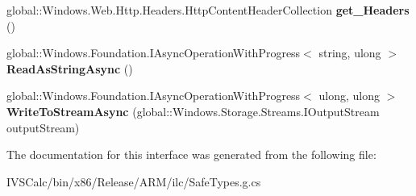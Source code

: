 \begin{DoxyCompactItemize}
global\+::\+Windows.\+Web.\+Http.\+Headers.\+Http\+Content\+Header\+Collection {\bfseries get\+\_\+\+Headers} ()
\item 
\mbox{\label{interface_windows_1_1_web_1_1_http_1_1_i_http_content_aef4019ba8a9cebd9b1025bb90c9b27c2}} 
global\+::\+Windows.\+Foundation.\+I\+Async\+Operation\+With\+Progress$<$ string, ulong $>$ {\bfseries Read\+As\+String\+Async} ()
\item 
\mbox{\label{interface_windows_1_1_web_1_1_http_1_1_i_http_content_afe0268dc0fae8ae3351e2e463f08e7f2}} 
global\+::\+Windows.\+Foundation.\+I\+Async\+Operation\+With\+Progress$<$ ulong, ulong $>$ {\bfseries Write\+To\+Stream\+Async} (global\+::\+Windows.\+Storage.\+Streams.\+I\+Output\+Stream output\+Stream)
\end{DoxyCompactItemize}


The documentation for this interface was generated from the following file\+:\begin{DoxyCompactItemize}
\item 
I\+V\+S\+Calc/bin/x86/\+Release/\+A\+R\+M/ilc/Safe\+Types.\+g.\+cs\end{DoxyCompactItemize}
